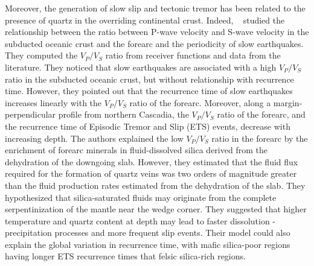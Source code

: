 \documentclass[draft]{agujournal2019}
\begin{document}
Moreover, the generation of slow slip and tectonic tremor has been related to the presence of quartz in the overriding continental crust. Indeed, ~ studied the relationship between the ratio between P-wave velocity and S-wave velocity in the subducted oceanic crust and the forearc and the periodicity of slow earthquakes. They computed the $V_P / V_S$ ratio from receiver functions and data from the literature. They noticed that slow earthquakes are associated with a high $V_P / V_S$ ratio in the subducted oceanic crust, but without relationship with recurrence time. However, they pointed out that the recurrence time of slow earthquakes increases linearly with the $V_P / V_S$ ratio of the forearc. Moreover, along a margin-perpendicular profile from northern Cascadia, the $V_P / V_S$ ratio of the forearc, and the recurrence time of Episodic Tremor and Slip (ETS) events, decrease with increasing depth. The authors explained the low $V_P / V_S$ ratio in the forearc by the enrichment of forearc minerals in fluid-dissolved silica derived from the dehydration of the downgoing slab. However, they estimated that the fluid flux required for the formation of quartz veins was two orders of magnitude greater than the fluid production rates estimated from the dehydration of the slab. They hypothesized that silica-saturated fluids may originate from the complete serpentinization of the mantle near the wedge corner. They suggested that higher temperature and quartz content at depth may lead to faster dissolution - precipitation processes and more frequent slip events. Their model could also explain the global variation in recurrence time, with mafic silica-poor regions having longer ETS recurrence times that felsic silica-rich regions. \\
\end{document}
